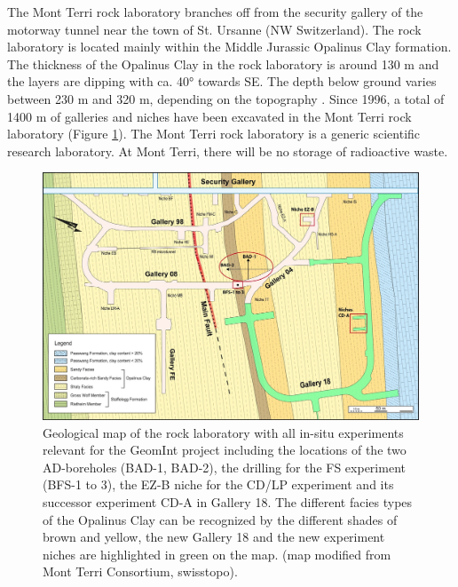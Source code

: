 The Mont Terri rock laboratory branches off from the security gallery of the motorway tunnel near the town of St. Ursanne (NW Switzerland). The rock laboratory is located mainly within the Middle Jurassic Opalinus Clay formation. The thickness of the Opalinus Clay in the rock laboratory is around 130 m \cite{hostettler2018} and the layers are dipping with ca. 40° towards SE. The depth below ground varies between 230 m and 320 m, depending on the topography \cite{heitzmann2001}. Since 1996, a total of 1400 m of galleries and niches have been excavated in the Mont Terri rock laboratory (Figure \ref{fig:bgr_mt_topview}). The Mont Terri rock laboratory is a generic scientific research laboratory. At Mont Terri, there will be no storage of radioactive waste.

\begin{figure}[!ht]
\centering
\includegraphics[width=1\textwidth]{./figures/bgr_mont_terri_top_view.jpg}
\caption{Geological map of the rock laboratory with all in-situ experiments relevant for the GeomInt project including the locations of the two AD-boreholes (BAD-1, BAD-2), the drilling for the FS experiment (BFS-1 to 3), the EZ-B niche for the CD/LP experiment and its successor experiment CD-A in Gallery 18. The different facies types of the Opalinus Clay can be recognized by the different shades of brown and yellow, the new Gallery 18 and the new experiment niches are highlighted in green on the map.  (map modified from Mont Terri Consortium, swisstopo).}
\label{fig:bgr_mt_topview}
\end{figure}

